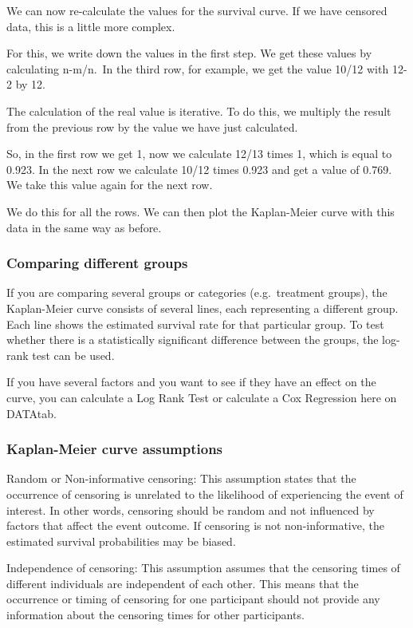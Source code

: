 \documentclass[
]{book}
\begin{document}
We can now re-calculate the values for the survival curve. If we have censored data, this is a little more complex.

For this, we write down the values in the first step. We get these values by calculating n-m/n.~In the third row, for example, we get the value 10/12 with 12-2 by 12.

The calculation of the real value is iterative. To do this, we multiply the result from the previous row by the value we have just calculated.

So, in the first row we get 1, now we calculate 12/13 times 1, which is equal to 0.923. In the next row we calculate 10/12 times 0.923 and get a value of 0.769. We take this value again for the next row.

We do this for all the rows. We can then plot the Kaplan-Meier curve with this data in the same way as before.

\hypertarget{comparing-different-groups}{%
\subsubsection{Comparing different groups}\label{comparing-different-groups}}

If you are comparing several groups or categories (e.g.~treatment groups), the Kaplan-Meier curve consists of several lines, each representing a different group. Each line shows the estimated survival rate for that particular group. To test whether there is a statistically significant difference between the groups, the log-rank test can be used.

If you have several factors and you want to see if they have an effect on the curve, you can calculate a Log Rank Test or calculate a Cox Regression here on DATAtab.

\hypertarget{kaplan-meier-curve-assumptions}{%
\subsubsection{Kaplan-Meier curve assumptions}\label{kaplan-meier-curve-assumptions}}

Random or Non-informative censoring: This assumption states that the occurrence of censoring is unrelated to the likelihood of experiencing the event of interest. In other words, censoring should be random and not influenced by factors that affect the event outcome. If censoring is not non-informative, the estimated survival probabilities may be biased.

Independence of censoring: This assumption assumes that the censoring times of different individuals are independent of each other. This means that the occurrence or timing of censoring for one participant should not provide any information about the censoring times for other participants.
\end{document}
